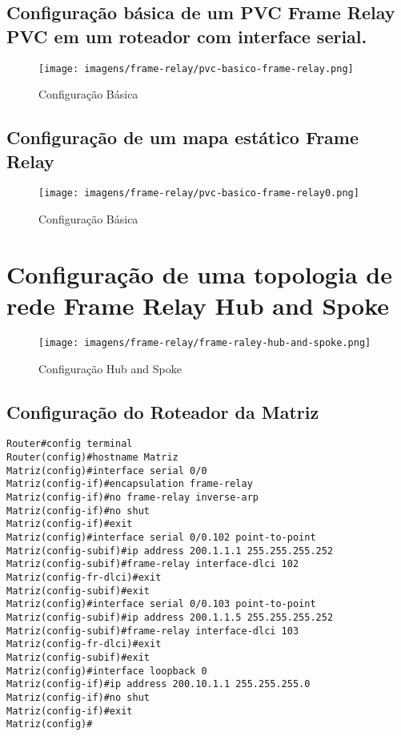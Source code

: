 \documentclass[]{article}
\begin{document}
\subsection{Configuração básica de um PVC Frame Relay PVC em um roteador
com interface
serial.}\label{configurauxe7uxe3o-buxe1sica-de-um-pvc-frame-relay-pvc-em-um-roteador-com-interface-serial.}

\begin{figure}[htbp]
\centering
\texttt{[image: imagens/frame-relay/pvc-basico-frame-relay.png]}
\caption{Configuração Básica}
\end{figure}

\subsection{Configuração de um mapa estático Frame
Relay}\label{configurauxe7uxe3o-de-um-mapa-estuxe1tico-frame-relay}

\begin{figure}[htbp]
\centering
\texttt{[image: imagens/frame-relay/pvc-basico-frame-relay0.png]}
\caption{Configuração Básica}
\end{figure}

\section{Configuração de uma topologia de rede Frame Relay Hub and
Spoke}\label{configurauxe7uxe3o-de-uma-topologia-de-rede-frame-relay-hub-and-spoke}

\begin{figure}[htbp]
\centering
\texttt{[image: imagens/frame-relay/frame-raley-hub-and-spoke.png]}
\caption{Configuração Hub and Spoke}
\end{figure}

\subsection{Configuração do Roteador da
Matriz}\label{configurauxe7uxe3o-do-roteador-da-matriz}

\begin{verbatim}
Router#config terminal
Router(config)#hostname Matriz
Matriz(config)#interface serial 0/0
Matriz(config-if)#encapsulation frame-relay
Matriz(config-if)#no frame-relay inverse-arp
Matriz(config-if)#no shut
Matriz(config-if)#exit
Matriz(config)#interface serial 0/0.102 point-to-point
Matriz(config-subif)#ip address 200.1.1.1 255.255.255.252
Matriz(config-subif)#frame-relay interface-dlci 102
Matriz(config-fr-dlci)#exit
Matriz(config-subif)#exit
Matriz(config)#interface serial 0/0.103 point-to-point
Matriz(config-subif)#ip address 200.1.1.5 255.255.255.252
Matriz(config-subif)#frame-relay interface-dlci 103
Matriz(config-fr-dlci)#exit
Matriz(config-subif)#exit
Matriz(config)#interface loopback 0
Matriz(config-if)#ip address 200.10.1.1 255.255.255.0
Matriz(config-if)#no shut
Matriz(config-if)#exit
Matriz(config)#
\end{verbatim}
\end{document}
